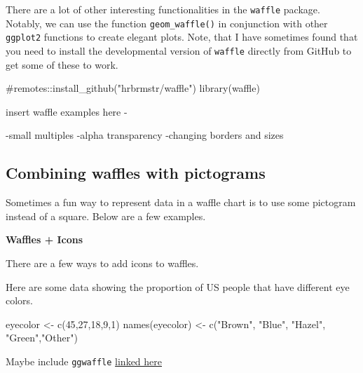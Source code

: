 \documentclass[
  letterpaper,
  DIV=11,
  numbers=noendperiod]{scrreprt}
\newenvironment{Shaded}{\begin{snugshade}}{\end{snugshade}}
\newcommand{\CommentTok}[1]{\textcolor[rgb]{0.37,0.37,0.37}{#1}}
\newcommand{\DecValTok}[1]{\textcolor[rgb]{0.68,0.00,0.00}{#1}}
\newcommand{\FunctionTok}[1]{\textcolor[rgb]{0.28,0.35,0.67}{#1}}
\newcommand{\NormalTok}[1]{\textcolor[rgb]{0.00,0.23,0.31}{#1}}
\newcommand{\OtherTok}[1]{\textcolor[rgb]{0.00,0.23,0.31}{#1}}
\newcommand{\StringTok}[1]{\textcolor[rgb]{0.13,0.47,0.30}{#1}}
\begin{document}
There are a lot of other interesting functionalities in the
\texttt{waffle} package. Notably, we can use the function
\texttt{geom\_waffle()} in conjunction with other \texttt{ggplot2}
functions to create elegant plots. Note, that I have sometimes found
that you need to install the developmental version of \texttt{waffle}
directly from GitHub to get some of these to work.

\begin{Shaded}
\begin{Highlighting}[]
\CommentTok{\#remotes::install\_github("hrbrmstr/waffle")}
\FunctionTok{library}\NormalTok{(waffle)}
\end{Highlighting}
\end{Shaded}

insert waffle examples here -

-small multiples -alpha transparency -changing borders and sizes

\hypertarget{combining-waffles-with-pictograms}{%
\subsection{Combining waffles with
pictograms}\label{combining-waffles-with-pictograms}}

Sometimes a fun way to represent data in a waffle chart is to use some
pictogram instead of a square. Below are a few examples.

\textbf{Waffles + Icons}

There are a few ways to add icons to waffles.

Here are some data showing the proportion of US people that have
different eye colors.

\begin{Shaded}
\begin{Highlighting}[]
\NormalTok{eyecolor }\OtherTok{\textless{}{-}} \FunctionTok{c}\NormalTok{(}\DecValTok{45}\NormalTok{,}\DecValTok{27}\NormalTok{,}\DecValTok{18}\NormalTok{,}\DecValTok{9}\NormalTok{,}\DecValTok{1}\NormalTok{)}
\FunctionTok{names}\NormalTok{(eyecolor) }\OtherTok{\textless{}{-}} \FunctionTok{c}\NormalTok{(}\StringTok{"Brown"}\NormalTok{, }\StringTok{"Blue"}\NormalTok{, }\StringTok{"Hazel"}\NormalTok{, }\StringTok{"Green"}\NormalTok{,}\StringTok{"Other"}\NormalTok{)}
\end{Highlighting}
\end{Shaded}

Maybe include \texttt{ggwaffle}
\href{https://liamgilbey.github.io/ggwaffle/}{linked here}
\end{document}
